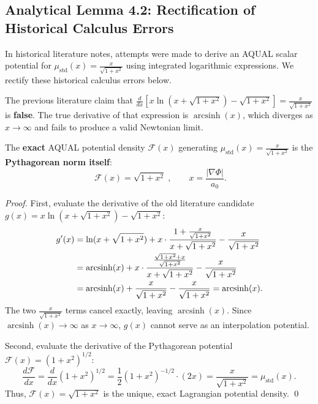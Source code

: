 \documentclass[11pt,a4paper]{article}
\theoremstyle{definition}
\begin{document}
\subsection{Analytical Lemma 4.2: Rectification of Historical Calculus Errors}
In historical literature notes, attempts were made to derive an AQUAL scalar potential for $\mu_{\text{std}}(x) = \frac{x}{\sqrt{1+x^2}}$ using integrated logarithmic expressions. We rectify these historical calculus errors below.

\begin{lemma}
\label{lem:calculus_correction}
The previous literature claim that $\frac{d}{dx} \left[ x\ln(x + \sqrt{1+x^2}) - \sqrt{1+x^2} \right] = \frac{x}{\sqrt{1+x^2}}$ is \textbf{false}. The true derivative of that expression is $\operatorname{arcsinh}(x)$, which diverges as $x \to \infty$ and fails to produce a valid Newtonian limit. 

The \textbf{exact} AQUAL potential density $\mathcal{F}(x)$ generating $\mu_{\text{std}}(x) = \frac{x}{\sqrt{1+x^2}}$ is the \textbf{Pythagorean norm itself}:
\begin{equation}
\boxed{\;\mathcal{F}(x) = \sqrt{1+x^2}\;}, \qquad x = \frac{|\nabla\Phi|}{a_0}.
\label{eq:pythagorean_potential}
\end{equation}
\end{lemma}

\begin{proof}
First, evaluate the derivative of the old literature candidate $g(x) = x\ln(x + \sqrt{1+x^2}) - \sqrt{1+x^2}$:
\begin{align}
g'(x) &= \ln(x + \sqrt{1+x^2}) + x \cdot \frac{1 + \frac{x}{\sqrt{1+x^2}}}{x + \sqrt{1+x^2}} - \frac{x}{\sqrt{1+x^2}} \notag \\
&= \operatorname{arcsinh}(x) + x \cdot \frac{\frac{\sqrt{1+x^2} + x}{\sqrt{1+x^2}}}{x + \sqrt{1+x^2}} - \frac{x}{\sqrt{1+x^2}} \notag \\
&= \operatorname{arcsinh}(x) + \frac{x}{\sqrt{1+x^2}} - \frac{x}{\sqrt{1+x^2}} = \operatorname{arcsinh}(x).
\end{align}
The two $\frac{x}{\sqrt{1+x^2}}$ terms cancel exactly, leaving $\operatorname{arcsinh}(x)$. Since $\operatorname{arcsinh}(x) \to \infty$ as $x \to \infty$, $g(x)$ cannot serve as an interpolation potential.

Second, evaluate the derivative of the Pythagorean potential $\mathcal{F}(x) = (1+x^2)^{1/2}$:
\begin{equation}
\frac{d\mathcal{F}}{dx} = \frac{d}{dx}(1+x^2)^{1/2} = \frac{1}{2}(1+x^2)^{-1/2} \cdot (2x) = \frac{x}{\sqrt{1+x^2}} = \mu_{\text{std}}(x).
\end{equation}
Thus, $\mathcal{F}(x) = \sqrt{1+x^2}$ is the unique, exact Lagrangian potential density. \qed
\end{proof}
\end{document}
